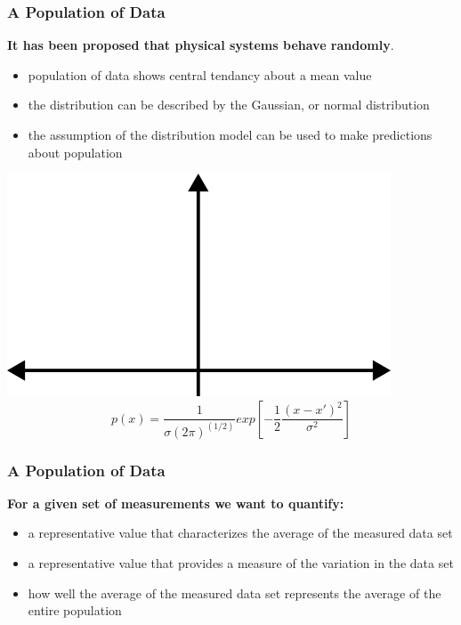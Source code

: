 \documentclass[fleqn]{beamer} %
\newcommand{\sectionIIsubsectionItitle}{A Population of Data}
\begin{document}
		
			\begin{frame}[label=sectionIIsubsectionI]
				\frametitle{\sectionIIsubsectionItitle}\scriptsize
			 
        \textbf {It has been proposed that physical systems behave randomly}.\vspace{2mm}\\ 
        \begin{itemize}
          \item population of data shows central tendancy about a mean value
          \item the distribution can be described by the Gaussian, or normal distribution
          \item the assumption of the distribution model can be used to make predictions about population
        \end{itemize} 
 \begin{multicols}{2}
  \includegraphics[scale=.5]{images/distribution_axes.png}     
  \[p(x)=\frac{1}{\sigma\left(2\pi\right)^{\left(1/2\right)}}exp\left[-\frac{1}{2}\frac{\left(x-x'\right)^2}{\sigma^2}\right] \]        
  \end{multicols}
    \end{frame}
      
      \begin{frame}[label=sectionIIsubsectionI]
				\frametitle{\sectionIIsubsectionItitle}

				\textbf{For a given set of measurements  we want to quantify:}
				\begin{itemize}
          
					\item a representative value that characterizes the average of the measured data set
					\item a representative value that provides a measure of the variation in the data set
					\item how well the average of the measured data set represents the average of the entire population
				\end{itemize}

			\end{frame}	
\end{document}
